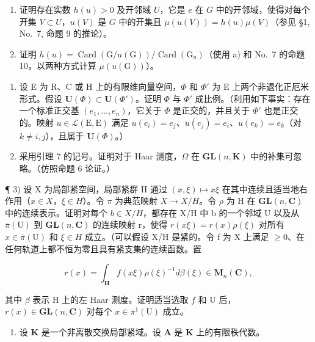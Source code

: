 \begin{enumerate}
\def\labelenumi{\alph{enumi})}
\item
  证明存在实数 \(h(u) > 0\) 及开邻域 \(U\)，它是 \(e\) 在 \(G\) 中的开邻域，使得对每个开集 \(V \subset U\)，\(u(V)\) 是 \(G\) 中的开集且 \(\mu(u(V)) = h(u)\mu(V)\)（参见 §1, No.~7, 命题 9 的推论）。
\item
  证明 \(h(u) = \operatorname{Card}(\mathrm{G} / u(\mathrm{G})) / \operatorname{Card}(\mathrm{G}_u)\)（使用 a) 和 No.~7 的命题 10，以两种方式计算 \(\mu(u(\mathrm{G}))\)）。
\end{enumerate}

\exercisesection{}

\begin{enumerate}
\def\labelenumi{\arabic{enumi})}
\item
  设 E 为 R、C 或 H 上的有限维向量空间，\(\Phi\) 和 \(\Phi'\) 为 E 上两个非退化正厄米形式。假设 \(\mathbf{U}(\Phi) \subset \mathbf{U}(\Phi')\)。证明 \(\Phi\) 与 \(\Phi'\) 成比例。（利用如下事实：存在一个标准正交基 \((e_{1}, \ldots, e_{n})\)，它关于 \(\Phi\) 是正交的，并且关于 \(\Phi'\) 也是正交的。映射 \(u \in \mathcal{L}(\mathrm{E}, \mathrm{E})\) 满足 \(u(e_{i}) = e_{j}\)、\(u(e_{j}) = e_{i}\)、\(u(e_{k}) = e_{k}\)（对 \(k \neq i, j\)），且属于 \(\mathbf{U}(\Phi)\)。）
\item
  采用引理 7 的记号。证明对于 Haar 测度，\(\Omega\) 在 \(\mathbf{GL}(n,\mathbf{K})\) 中的补集可忽略。（仿照命题 6 论证。）
\end{enumerate}

¶ 3) 设 X 为局部紧空间，局部紧群 H 通过 \((x,\xi)\mapsto x\xi\) 在其中连续且适当地右作用（\(x\in X\)，\(\xi\in H\)）。令 \(\pi\) 为典范映射 \(X\to X/H\)。令 \(\rho\) 为 H 在 \(\mathbf{GL}(n,\mathbf{C})\) 中的连续表示。证明对每个 \(b\in X/H\)，都存在 X/H 中 b 的一个邻域 U 以及从 \(\overline{\pi}(\mathrm{U})\) 到 \(\mathbf{GL}(n,\mathbf{C})\) 的连续映射 r，使得 \(r(x\xi)=r(x)\rho(\xi)\) 对所有 \(x\in\overline{\pi}(\mathrm{U})\) 和 \(\xi\in H\) 成立。（可以假设 X/H 是紧的。令 f 为 X 上满足 \(\geqslant0\)、在任何轨道上都不恒为零且具有紧支集的连续函数。置

\[
r (x) = \int_ {\mathbf {H}} f (x \xi) \rho (\xi) ^ {- 1} d \beta (\xi) \in \mathbf {M} _ {n} (\mathbf {C}),
\]

其中 \(\beta\) 表示 H 上的左 Haar 测度。证明适当选取 \(f\) 和 U 后，\(r(x) \in \mathbf{GL}(n, \mathbf{C})\) 对每个 \(x \in \overline{\pi}^1(\mathrm{U})\) 成立。

\begin{enumerate}
\def\labelenumi{\arabic{enumi})}
\setcounter{enumi}{3}
\tightlist
\item
  设 \(\mathbf{K}\) 是一个非离散交换局部紧域。设 \(\mathbf{A}\) 是 \(\mathbf{K}\) 上的有限秩代数。
\end{enumerate}

